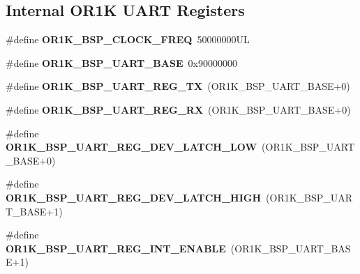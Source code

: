 \subsection*{Internal O\+R1K U\+A\+RT Registers}
\begin{DoxyCompactItemize}
\item 
\mbox{\label{group__generic__or1k__reg_gaca734e1edbf1f42f6ef92a03eef352f5}} 
\#define {\bfseries O\+R1\+K\+\_\+\+B\+S\+P\+\_\+\+C\+L\+O\+C\+K\+\_\+\+F\+R\+EQ}~50000000\+UL
\item 
\mbox{\label{group__generic__or1k__reg_ga3fa668dc5ffb7d7af8f824161796a14e}} 
\#define {\bfseries O\+R1\+K\+\_\+\+B\+S\+P\+\_\+\+U\+A\+R\+T\+\_\+\+B\+A\+SE}~0x90000000
\item 
\mbox{\label{group__generic__or1k__reg_ga6876e55ea0a8020c4597b7fdd180c72d}} 
\#define {\bfseries O\+R1\+K\+\_\+\+B\+S\+P\+\_\+\+U\+A\+R\+T\+\_\+\+R\+E\+G\+\_\+\+TX}~(O\+R1\+K\+\_\+\+B\+S\+P\+\_\+\+U\+A\+R\+T\+\_\+\+B\+A\+SE+0)
\item 
\mbox{\label{group__generic__or1k__reg_ga49ecdb40b5cee7218119ace03dc89915}} 
\#define {\bfseries O\+R1\+K\+\_\+\+B\+S\+P\+\_\+\+U\+A\+R\+T\+\_\+\+R\+E\+G\+\_\+\+RX}~(O\+R1\+K\+\_\+\+B\+S\+P\+\_\+\+U\+A\+R\+T\+\_\+\+B\+A\+SE+0)
\item 
\mbox{\label{group__generic__or1k__reg_ga1dfea85f733e6ab9127641db7f13e5d6}} 
\#define {\bfseries O\+R1\+K\+\_\+\+B\+S\+P\+\_\+\+U\+A\+R\+T\+\_\+\+R\+E\+G\+\_\+\+D\+E\+V\+\_\+\+L\+A\+T\+C\+H\+\_\+\+L\+OW}~(O\+R1\+K\+\_\+\+B\+S\+P\+\_\+\+U\+A\+R\+T\+\_\+\+B\+A\+SE+0)
\item 
\mbox{\label{group__generic__or1k__reg_gae0aecdce04ce10871da48b5d40d19156}} 
\#define {\bfseries O\+R1\+K\+\_\+\+B\+S\+P\+\_\+\+U\+A\+R\+T\+\_\+\+R\+E\+G\+\_\+\+D\+E\+V\+\_\+\+L\+A\+T\+C\+H\+\_\+\+H\+I\+GH}~(O\+R1\+K\+\_\+\+B\+S\+P\+\_\+\+U\+A\+R\+T\+\_\+\+B\+A\+SE+1)
\item 
\mbox{\label{group__generic__or1k__reg_ga9cca9398029460cb98570fd08e213e00}} 
\#define {\bfseries O\+R1\+K\+\_\+\+B\+S\+P\+\_\+\+U\+A\+R\+T\+\_\+\+R\+E\+G\+\_\+\+I\+N\+T\+\_\+\+E\+N\+A\+B\+LE}~(O\+R1\+K\+\_\+\+B\+S\+P\+\_\+\+U\+A\+R\+T\+\_\+\+B\+A\+SE+1)

\end{DoxyCompactItemize}

